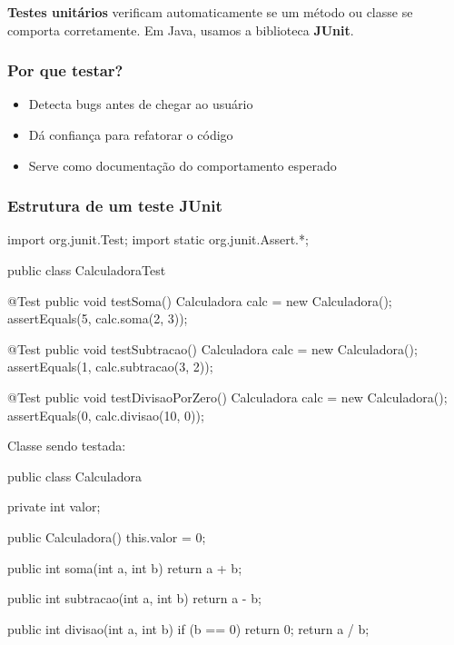 \documentclass[11pt,a4paper]{article}
\begin{document}
\textbf{Testes unitários} verificam automaticamente se um método ou classe se comporta corretamente. Em Java, usamos a biblioteca \textbf{JUnit}.

\subsubsection{Por que testar?}

\begin{itemize}
\item Detecta bugs antes de chegar ao usuário
\item Dá confiança para refatorar o código
\item Serve como documentação do comportamento esperado
\end{itemize}

\subsubsection{Estrutura de um teste JUnit}

\begin{javacode}
import org.junit.Test;
import static org.junit.Assert.*;

public class CalculadoraTest {

    @Test
    public void testSoma() {
        Calculadora calc = new Calculadora();
        assertEquals(5, calc.soma(2, 3));
    }

    @Test
    public void testSubtracao() {
        Calculadora calc = new Calculadora();
        assertEquals(1, calc.subtracao(3, 2));
    }

    @Test
    public void testDivisaoPorZero() {
        Calculadora calc = new Calculadora();
        assertEquals(0, calc.divisao(10, 0));
    }
}
\end{javacode}

Classe sendo testada:

\begin{javacode}
public class Calculadora {
    private int valor;

    public Calculadora() {
        this.valor = 0;
    }

    public int soma(int a, int b) {
        return a + b;
    }

    public int subtracao(int a, int b) {
        return a - b;
    }

    public int divisao(int a, int b) {
        if (b == 0) return 0;
        return a / b;
    }
}
\end{javacode}
\end{document}
